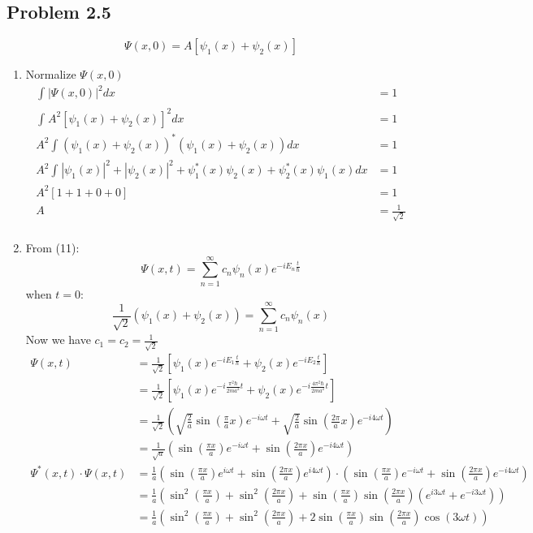 \documentclass{article}
\begin{document}
\subsection*{Problem 2.5}
\begingroup
\allowdisplaybreaks
\[\Psi(x,0)=A \left[\psi_1(x) + \psi_2(x)\right] \] 
    \begin{enumerate}[label=(\alph*)]
        \item Normalize \(\Psi(x,0)\)
        \begin{align*}
            \int_{}^{} |\Psi(x,0)|^2 dx &= 1 \\
            \int_{}^{} A^2 \left[\psi_1(x) + \psi_2(x)\right]^2 dx &= 1 \\
            A^2 \int_{}^{} \left(\psi_1(x)+\psi_2(x)\right)^*\left(\psi_1(x)+\psi_2(x)\right)dx &= 1 \\
            A^2 \int_{}^{} |\psi_1(x)|^2 + |\psi_2(x)|^2 + \psi_1^*(x)\psi_2(x) + \psi_2^*(x)\psi_1(x) dx &= 1 \\
            A^2 \left[1+1+0+0\right] &= 1 \\
            A &= \frac{1}{\sqrt{2}} \\
        \end{align*}
        \item From (11):
        \[\Psi(x,t) =  \sum_{n=1}^{\infty}c_n \psi_n(x) e^{-iE_n\frac{t}{\hbar}}\]
        when \(t = 0\):
        \[\frac{1}{\sqrt{2}}(\psi_1(x)+\psi_2(x)) = \sum_{n=1}^{\infty} c_n\psi_n(x)\]
        Now we have \(c_1=c_2=\frac{1}{\sqrt{2}}\)
        \begin{align}
            \Psi(x,t) &= \frac{1}{\sqrt{2}}\left[\psi_1(x)e^{-iE_1\frac{t}{\hbar}} + \psi_2(x)e^{-iE_2\frac{t}{\hbar}}\right] \\
            &= \frac{1}{\sqrt{2}}\left[\psi_1(x)e^{-i\frac{\pi^2\hbar}{2ma^2}t} + \psi_2(x)e^{-i\frac{4\pi^2\hbar}{2ma^2}t}\right] \\
            &= \frac{1}{\sqrt{2}} \left(\sqrt{\frac{2}{a}}\sin\left(\frac{\pi}{a}x\right)e^{-i\omega t} + \sqrt{\frac{2}{a}}\sin\left(\frac{2\pi}{a}x\right)e^{-i4\omega t}\right)\\
            &= \frac{1}{\sqrt{a}} \left(\sin \left(\frac{\pi x}{a}\right) e^{-i\omega t} + \sin\left(\frac{2\pi x}{a}\right)e^{-i 4 \omega t}\right) \\ 
            \Psi^*(x,t)\cdot\Psi(x,t) &= \frac{1}{a} \left(\sin\left(\frac{\pi x}{a}\right)e^{i \omega t} + \sin \left(\frac{2 \pi x}{a}\right)e^{i4\omega t}\right) \cdot \left(\sin \left(\frac{\pi x}{a}\right) e^{-i\omega t} + \sin\left(\frac{2\pi x}{a}\right)e^{-i 4 \omega t}\right) \\
            &= \frac{1}{a} \left(\sin^2\left(\frac{\pi x }{a}\right) + \sin^2 \left(\frac{2 \pi x}{a}\right) + \sin\left(\frac{\pi x }{a}\right)\sin\left(\frac{2 \pi x}{a}\right) \left(e^{i 3 \omega t} + e^{-i 3 \omega t}\right)\right) \\
            &= \frac{1}{a} \left(\sin^2\left(\frac{\pi x }{a}\right) + \sin^2 \left(\frac{2 \pi x}{a}\right) + 2\sin\left(\frac{\pi x}{a}\right)\sin\left(\frac{2 \pi x}{a}\right)\cos\left(3 \omega t\right)\right)
        \end{align}
        

\end{enumerate}
\end{document}
